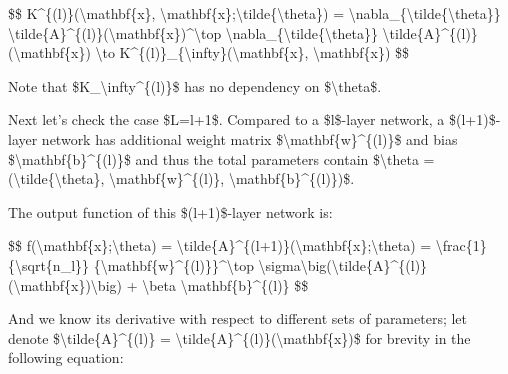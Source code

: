 \$\$ K\^{}\{(l)\}(\textbackslash mathbf\{x\}, \textbackslash mathbf\{x\}\textquotesingle;\textbackslash tilde\{\textbackslash theta\}) = \textbackslash nabla\_\{\textbackslash tilde\{\textbackslash theta\}\} \textbackslash tilde\{A\}\^{}\{(l)\}(\textbackslash mathbf\{x\})\^{}\textbackslash top \textbackslash nabla\_\{\textbackslash tilde\{\textbackslash theta\}\} \textbackslash tilde\{A\}\^{}\{(l)\}(\textbackslash mathbf\{x\}\textquotesingle) \textbackslash to K\^{}\{(l)\}\_\{\textbackslash infty\}(\textbackslash mathbf\{x\}, \textbackslash mathbf\{x\}\textquotesingle) \$\$

Note that \$K\_\textbackslash infty\^{}\{(l)\}\$ has no dependency on \$\textbackslash theta\$.

Next let's check the case \$L=l+1\$. Compared to a \$l\$-layer network, a \$(l+1)\$-layer network has additional weight matrix \$\textbackslash mathbf\{w\}\^{}\{(l)\}\$ and bias \$\textbackslash mathbf\{b\}\^{}\{(l)\}\$ and thus the total parameters contain \$\textbackslash theta = (\textbackslash tilde\{\textbackslash theta\}, \textbackslash mathbf\{w\}\^{}\{(l)\}, \textbackslash mathbf\{b\}\^{}\{(l)\})\$.

The output function of this \$(l+1)\$-layer network is:

\$\$ f(\textbackslash mathbf\{x\};\textbackslash theta) = \textbackslash tilde\{A\}\^{}\{(l+1)\}(\textbackslash mathbf\{x\};\textbackslash theta) = \textbackslash frac\{1\}\{\textbackslash sqrt\{n\_l\}\} \{\textbackslash mathbf\{w\}\^{}\{(l)\}\}\^{}\textbackslash top \textbackslash sigma\textbackslash big(\textbackslash tilde\{A\}\^{}\{(l)\}(\textbackslash mathbf\{x\})\textbackslash big) + \textbackslash beta \textbackslash mathbf\{b\}\^{}\{(l)\} \$\$

And we know its derivative with respect to different sets of parameters; let denote \$\textbackslash tilde\{A\}\^{}\{(l)\} = \textbackslash tilde\{A\}\^{}\{(l)\}(\textbackslash mathbf\{x\})\$ for brevity in the following equation:

